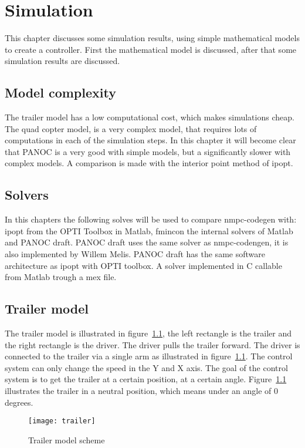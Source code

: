 \chapter{Simulation}
This chapter discusses some simulation results, using simple mathematical models to create a controller. First the mathematical model is discussed, after that some simulation results are discussed.

\section{Model complexity}
The trailer model has a low computational cost, which makes simulations cheap. The quad copter model, is a very complex model, that requires lots of computations in each of the simulation steps. In this chapter it will become clear that PANOC is a very good with simple models, but a significantly slower with complex models. A comparison is made with the interior point method of ipopt.

\section{Solvers}
In this chapters the following solves will be used to compare nmpc-codegen with:
ipopt from the OPTI Toolbox in Matlab, fmincon the internal solvers of Matlab and PANOC draft. PANOC draft uses the same solver as nmpc-codengen, it is also implemented by Willem Melis. PANOC draft has the same software architecture as ipopt with OPTI toolbox. A solver implemented in C callable from Matlab trough a mex file.

\section{Trailer model}
The trailer model is illustrated in figure~\ref{fig:trailer model}, the left rectangle is the trailer and the right rectangle is the driver. The driver pulls the trailer forward. The driver is connected to the trailer via a single arm as illustrated in figure~\ref{fig:trailer model}. The control system can only change the speed in the Y and X axis. The goal of the control system is to get the trailer at a certain position, at a certain angle. Figure~\ref{fig:trailer model} illustrates the trailer in a neutral position, which means under an angle of 0 degrees.

\begin{figure}
	\centering
	\texttt{[image: trailer]}
	\caption{Trailer model scheme}
	\label{fig:trailer model}
\end{figure}


